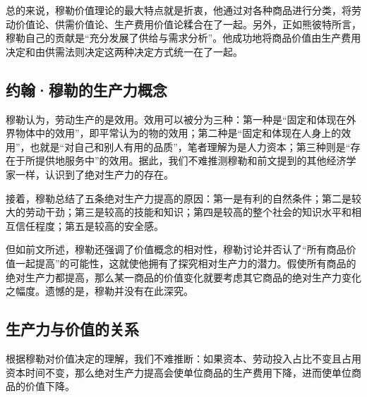 总的来说，穆勒价值理论的最大特点就是折衷，他通过对各种商品进行分类，将劳动价值论、供需价值论、生产费用价值论糅合在了一起。另外，正如熊彼特所言，穆勒自己的贡献是“充分发展了供给与需求分析”\cite[359]{YueSeFu*XiongBiTeJingJiFenXiShiDi2Juan2017}。他成功地将商品价值由生产费用决定和由供需法则决定这两种决定方式统一在了一起。

 \subsection{约翰·穆勒的生产力概念}

穆勒认为，劳动生产的是效用\cite[60]{YueHan*MuLeZhengZhiJingJiXueYuanLiJiQiZaiSheHuiZheXueShangDeRuoGanYingYongShangJuan1991}。效用可以被分为三种：第一种是“固定和体现在外界物体中的效用”\cite[62]{YueHan*MuLeZhengZhiJingJiXueYuanLiJiQiZaiSheHuiZheXueShangDeRuoGanYingYongShangJuan1991}，即平常认为的物的效用；第二种是“固定和体现在人身上的效用”，也就是“对自己和别人有用的品质”\cite[62]{YueHan*MuLeZhengZhiJingJiXueYuanLiJiQiZaiSheHuiZheXueShangDeRuoGanYingYongShangJuan1991}，笔者理解为是人力资本；第三种则是“存在于所提供地服务中”的效用\cite[62]{YueHan*MuLeZhengZhiJingJiXueYuanLiJiQiZaiSheHuiZheXueShangDeRuoGanYingYongShangJuan1991}。据此，我们不难推测穆勒和前文提到的其他经济学家一样，认识到了绝对生产力的存在。

接着，穆勒总结了五条绝对生产力提高的原因：第一是有利的自然条件；第二是较大的劳动干劲；第三是较高的技能和知识；第四是较高的整个社会的知识水平和相互信任程度；第五是较高的安全感。\cite[123-135]{YueHan*MuLeZhengZhiJingJiXueYuanLiJiQiZaiSheHuiZheXueShangDeRuoGanYingYongShangJuan1991}

但如前文所述，穆勒还强调了价值概念的相对性，穆勒讨论并否认了“所有商品价值一起提高”的可能性，这就使他拥有了探究相对生产力的潜力。假使所有商品的绝对生产力都提高，那么某一商品的价值变化就要考虑其它商品的绝对生产力变化之幅度。遗憾的是，穆勒并没有在此深究。

\subsection{生产力与价值的关系}

根据穆勒对价值决定的理解，我们不难推断：如果资本、劳动投入占比不变且占用资本时间不变，那么绝对生产力提高会使单位商品的生产费用下降，进而使单位商品的价值下降。
